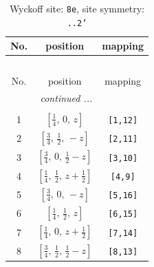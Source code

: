 \documentclass[fleqn,8pt]{jsarticle}
\begin{document}
\begin{longtable}{ccc}
\caption{Wyckoff site: {\tt 8e}, site symmetry: {\tt ..2'}}
 \\
 \hline \hline
No. & position & mapping \\ \hline \endfirsthead

\multicolumn{2}{l}{\tablename\ \thetable{}} \\
 \hline \hline
No. & position & mapping \\ \hline \endhead

 \hline \hline
\multicolumn{2}{r}{\footnotesize\it continued ...} \\ \endfoot

 \hline \hline
\multicolumn{2}{r}{} \\ \endlastfoot

1 & $\left[ \frac{1}{4},\, 0,\, z \right]$ & {\tt [1,12]} \\ \hline
2 & $\left[ \frac{3}{4},\, \frac{1}{2},\, - z \right]$ & {\tt [2,11]} \\ \hline
3 & $\left[ \frac{3}{4},\, 0,\, \frac{1}{2} - z \right]$ & {\tt [3,10]} \\ \hline
4 & $\left[ \frac{1}{4},\, \frac{1}{2},\, z + \frac{1}{2} \right]$ & {\tt [4,9]} \\ \hline
5 & $\left[ \frac{3}{4},\, 0,\, - z \right]$ & {\tt [5,16]} \\ \hline
6 & $\left[ \frac{1}{4},\, \frac{1}{2},\, z \right]$ & {\tt [6,15]} \\ \hline
7 & $\left[ \frac{1}{4},\, 0,\, z + \frac{1}{2} \right]$ & {\tt [7,14]} \\ \hline
8 & $\left[ \frac{3}{4},\, \frac{1}{2},\, \frac{1}{2} - z \right]$ & {\tt [8,13]} \\
\end{longtable}
\renewcommand{\arraystretch}{1.2}
\end{document}
